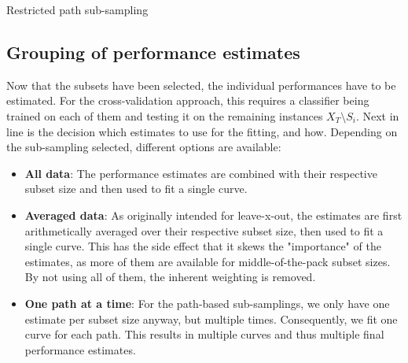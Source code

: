 \begin{algorithm}
	\begin{algorithmic}[1]
		\State {}
		\State {}
		\EndFor
		\EndFor
	\end{algorithmic}
	\caption{Restricted path sub-sampling}
	\label{alg:resPathSubSampling}
\end{algorithm}

\subsection{Grouping of performance estimates}
Now that the subsets have been selected, the individual performances have to be estimated. For the cross-validation approach, this requires a classifier being trained on each of them and testing it on the remaining instances $X_T \setminus S_i$. Next in line is the decision which estimates to use for the fitting, and how. Depending on the sub-sampling selected, different options are available:

\begin{itemize}
	\item \textbf{All data}: The performance estimates are combined with their respective subset size and then used to fit a single curve.
	\item \textbf{Averaged data}: As originally intended for leave-x-out, the estimates are first arithmetically averaged over their respective subset size, then used to fit a single curve. This has the side effect that it skews the "importance" of the estimates, as more of them are available for middle-of-the-pack subset sizes. By not using all of them, the inherent weighting is removed.
	\item \textbf{One path at a time}: For the path-based sub-samplings, we only have one estimate per subset size anyway, but multiple times. Consequently, we fit one curve for each path. This results in multiple curves and thus multiple final performance estimates.
\end{itemize}

